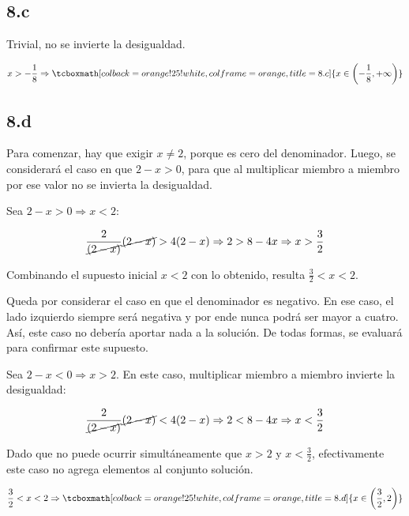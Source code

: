 \documentclass{article}
\newcommand{\hresult}[2]{\tcboxmath[colback=orange!25!white,colframe=orange, title=#1] {#2} }
\begin{document}
\subsection*{8.c}
\label{subsec:8.c}

Trivial, no se invierte la desigualdad.

\begin{equation}
x > -\frac{1}{8} \Rightarrow \hresult{8.c} { x \in \left(-\frac{1}{8}, +\infty \right) }
\end{equation}

\subsection*{8.d}
\label{subsec:8.d}

Para comenzar, hay que exigir $x \neq 2$, porque es cero del denominador. Luego, se considerará el caso en que $2-x > 0$, para que al multiplicar miembro a miembro por ese valor no se invierta la desigualdad.

Sea $2 - x > 0 \Rightarrow x < 2$:

\begin{equation}
\frac{2}{\cancel{(2-x)}} \cancel{(2-x)} > 4 (2-x) \Rightarrow 2 > 8-4x \Rightarrow x > \frac{3}{2}
\end{equation}

Combinando el supuesto inicial $x < 2$ con lo obtenido, resulta $\frac{3}{2} < x < 2$.

Queda por considerar el caso en que el denominador es negativo. En ese caso, el lado izquierdo siempre será negativa y por ende nunca podrá ser mayor a cuatro. Así, este caso no debería aportar nada a la solución. De todas formas, se evaluará para confirmar este supuesto.

Sea $2 - x < 0 \Rightarrow x > 2$. En este caso, multiplicar miembro a miembro invierte la desigualdad:

\begin{equation}
\frac{2}{\cancel{(2-x)}} \cancel{(2-x)} < 4 (2-x) \Rightarrow 2 < 8-4x \Rightarrow x < \frac{3}{2}
\end{equation}

Dado que no puede ocurrir simultáneamente que $x > 2$ y $x < \frac{3}{2}$, efectivamente este caso no agrega elementos al conjunto solución.

\begin{equation}
\frac{3}{2} < x < 2 \Rightarrow \hresult{8.d} { x \in \left(\frac{3}{2}, 2 \right) }
\end{equation}
\end{document}
